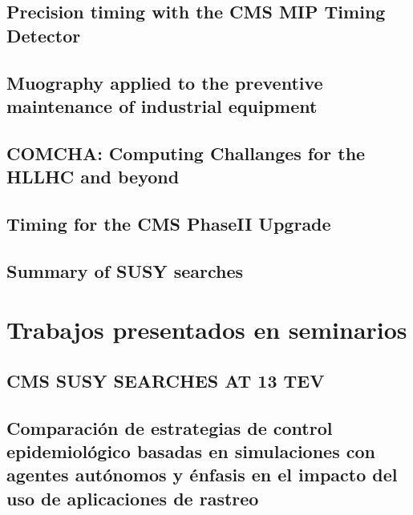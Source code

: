 \documentclass[a4paper, 11pt, twoside, openright]{report}
\begin{document}
\subsection{Precision timing with the CMS MIP Timing Detector}

\subsection{Muography applied to the preventive maintenance of industrial equipment}

\subsection{COMCHA: Computing Challanges for the HLLHC and beyond}

\subsection{Timing for the CMS PhaseII Upgrade}

\subsection{Summary of SUSY searches}



\section{Trabajos presentados en seminarios}

\subsection{CMS SUSY SEARCHES AT 13 TEV}


\subsection{Comparación de estrategias de control epidemiológico basadas en simulaciones con agentes autónomos y énfasis en el impacto del uso de aplicaciones de rastreo}

\end{document}
